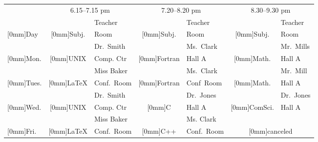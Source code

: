 \documentclass{article}
\begin{document}
\newcommand{\rb}[1]{\raisebox{1.5ex}[0mm]{#1}}
\begin{center}\small
\begin{tabular}{|l||c|l|c|l|c|l|} 
\hline
& \multicolumn{2}{c|}{6.15--7.15 pm} & \multicolumn{2}{c|}{7.20--8.20 pm}
& \multicolumn{2}{c|}{8.30--9.30 pm} \\ \cline{2-7}
&& Teacher && Teacher && Teacher \\ \cline{3-3}\cline{5-5}\cline{7-7}
\rb{Day} & \rb{Subj.} & Room & \rb{Subj.} & Room & \rb{Subj.} & Room\\ 
   \hline\hline
&& Dr.~Smith && Ms.~Clark && Mr.~Mills\\
\cline{3-3}\cline{5-5}\cline{7-7}
\rb{Mon.} & \rb{UNIX} & Comp. Ctr & \rb{Fortran} & Hall A 
  & \rb{Math.} & Hall A \\ \hline 
&& Miss Baker && Ms.~Clark && Mr.~Mill\\
\cline{3-3}\cline{5-5}\cline{7-7}
\rb{Tues.} & \rb{\LaTeX} & Conf.~Room & \rb{Fortran} & Conf~Room
  & \rb{Math.} & Hall A \\ \hline
&& Dr.~Smith && Dr.~Jones && Dr.~Jones \\
\cline{3-3}\cline{5-5}\cline{7-7}
\rb{Wed.} & \rb{UNIX} & Comp. Ctr & \rb{C} & Hall A
  & \rb{ComSci.} & Hall A \\ \hline
&& Miss Baker && Ms. Clark & \multicolumn{2}{c|}{} \\
\cline{3-3}\cline{5-5}
\rb{Fri.} & \rb{\LaTeX} & Conf.~Room & \rb{C++} & Conf.~Room 
& \multicolumn{2}{c|}{\rb{canceled}}\\ \hline
\end{tabular}\end{center}
\end{document}
